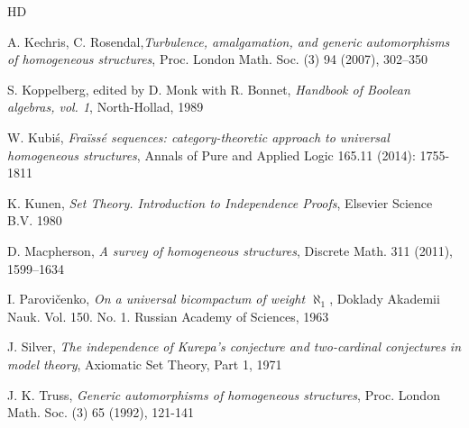 \documentclass[11pt]{amsart}
\theoremstyle{definition}
\begin{document}
\begin{thebibliography}{HD}
\begin{small}
         A. Kechris, C. Rosendal,\textit{Turbulence, amalgamation, and generic automorphisms of homogeneous structures}, Proc. London Math. Soc. (3) 94 (2007), 302–350

         S. Koppelberg, edited by D. Monk with R. Bonnet, \textit{Handbook of Boolean algebras, vol. 1}, North-Hollad, 1989

		
		 W. Kubi\'s, \textit{Fra\"iss\'e sequences: category-theoretic approach to universal homogeneous structures}, Annals of Pure and Applied Logic 165.11 (2014): 1755-1811 
		
		 K. Kunen, \textit{Set Theory. Introduction to Independence Proofs}, Elsevier Science B.V. 1980

         D. Macpherson, \textit{A survey of homogeneous structures}, Discrete Math. 311 (2011), 1599–1634

         I. Parovi\v{c}enko, \textit{On a universal bicompactum of weight $\aleph_1$}, Doklady Akademii Nauk. Vol. 150. No. 1. Russian Academy of Sciences, 1963
        
         J. Silver, \textit{The independence of Kurepa's conjecture and two-cardinal conjectures in model theory}, Axiomatic Set Theory, Part 1, 1971

        
         J. K. Truss, \textit{Generic automorphisms of homogeneous structures}, Proc. London Math. Soc. (3) 65 (1992), 121-141

        

        

        

        
	\end{small}
\end{thebibliography}


	
\end{document}
